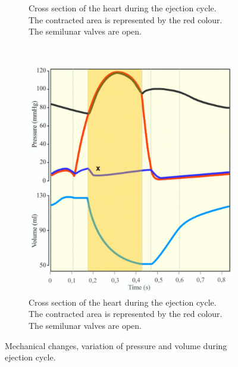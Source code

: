 \begin{figure}[!htpb]
\begin{subfigure}[t]{0.48\textwidth}
	\centering
	\caption{Cross section of the heart during the ejection cycle. The contracted area is represented by the red colour. The semilunar valves are open.}
	\label{fig:heart ejection}
\end{subfigure}
~
\begin{subfigure}[t]{0.48\textwidth}
	\centering
	\includegraphics[width=\textwidth,keepaspectratio]{figure_7}
	\caption{Cross section of the heart during the ejection cycle. The contracted area is represented by the red colour. The semilunar valves are open.}
	\label{fig:pressure ejection}
\end{subfigure}
	\caption[Heart's ejection]{Mechanical changes, variation of pressure and volume during ejection cycle.}
\end{figure}

